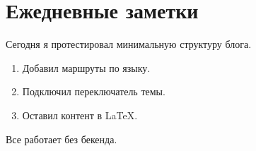 \section{Ежедневные заметки}

Сегодня я протестировал минимальную структуру блога.

\begin{enumerate}
\item Добавил маршруты по языку.
\item Подключил переключатель темы.
\item Оставил контент в LaTeX.
\end{enumerate}

Все работает без бекенда.
